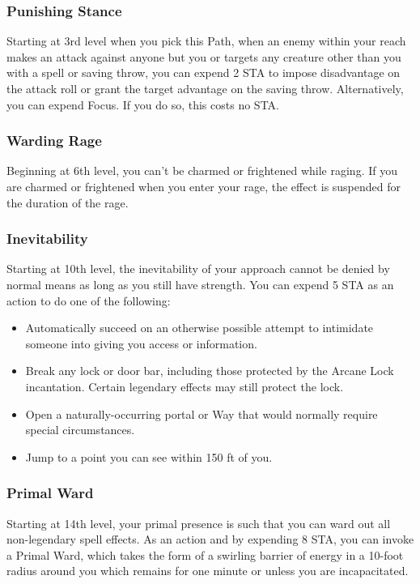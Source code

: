 \subsubsection{Punishing Stance}

Starting at 3rd level when you pick this Path, when an enemy within your reach makes an attack against anyone but you or targets any creature other than you with a spell or saving throw, you can expend 2 STA to impose disadvantage on the attack roll or grant the target advantage on the saving throw. Alternatively, you can expend Focus. If you do so, this costs no STA.

\subsubsection{Warding Rage}

Beginning at 6th level, you can’t be charmed or frightened while raging. If you are charmed or frightened when you enter your rage, the effect is suspended for the duration of the rage.

\subsubsection{Inevitability}

Starting at 10th level, the inevitability of your approach cannot be denied by normal means as long as you still have strength. You can expend 5 STA as an action to do one of the following:
\begin{itemize}
\item  Automatically succeed on an otherwise possible attempt to intimidate someone into giving you access or information.
\item  Break any lock or door bar, including those protected by the Arcane Lock incantation. Certain legendary effects may still protect the lock.
\item  Open a naturally-occurring portal or Way that would normally require special circumstances.
\item  Jump to a point you can see within 150 ft of you.
\end{itemize}

\subsubsection{Primal Ward}

Starting at 14th level, your primal presence is such that you can ward out all non-legendary spell effects. As an action and by expending 8 STA, you can invoke a Primal Ward, which takes the form of a swirling barrier of energy in a 10-foot radius around you which remains for one minute or unless you are incapacitated.

